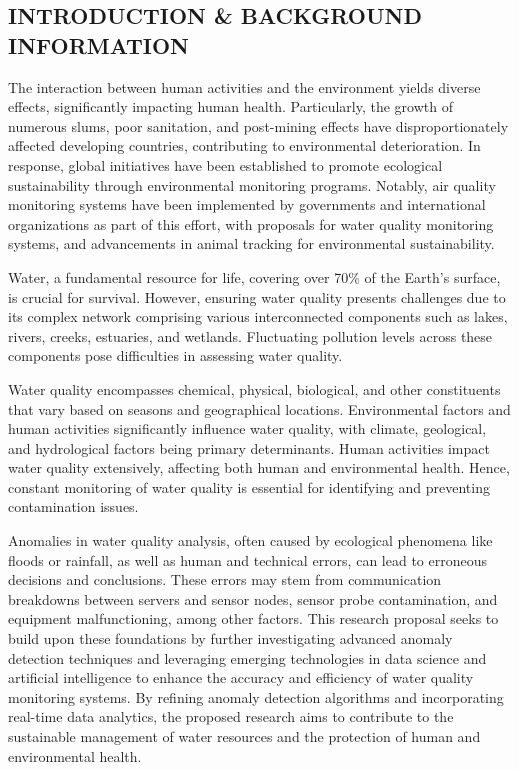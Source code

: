 \documentclass[12pt]{report}
\begin{document}
\subsection{\centering INTRODUCTION & BACKGROUND INFORMATION}
\par
The interaction between human activities and the environment yields diverse effects, significantly impacting human health. Particularly, the growth of numerous slums, poor sanitation, and post-mining effects have disproportionately affected developing countries, contributing to environmental deterioration. In response, global initiatives have been established to promote ecological sustainability through environmental monitoring programs. Notably, air quality monitoring systems have been implemented by governments and international organizations as part of this effort, with proposals for water quality monitoring systems, and advancements in animal tracking for environmental sustainability.

Water, a fundamental resource for life, covering over 70\% of the Earth's surface, is crucial for survival. However, ensuring water quality presents challenges due to its complex network comprising various interconnected components such as lakes, rivers, creeks, estuaries, and wetlands. Fluctuating pollution levels across these components pose difficulties in assessing water quality.

Water quality encompasses chemical, physical, biological, and other constituents that vary based on seasons and geographical locations. Environmental factors and human activities significantly influence water quality, with climate, geological, and hydrological factors being primary determinants. Human activities impact water quality extensively, affecting both human and environmental health. Hence, constant monitoring of water quality is essential for identifying and preventing contamination issues.
\par
Anomalies in water quality analysis, often caused by ecological phenomena like floods or rainfall, as well as human and technical errors, can lead to erroneous decisions and conclusions. These errors may stem from communication breakdowns between servers and sensor nodes, sensor probe contamination, and equipment malfunctioning, among other factors.
This research proposal seeks to build upon these foundations by further investigating advanced anomaly detection techniques and leveraging emerging technologies in data science and artificial intelligence to enhance the accuracy and efficiency of water quality monitoring systems. By refining anomaly detection algorithms and incorporating real-time data analytics, the proposed research aims to contribute to the sustainable management of water resources and the protection of human and environmental health.
\end{document}
